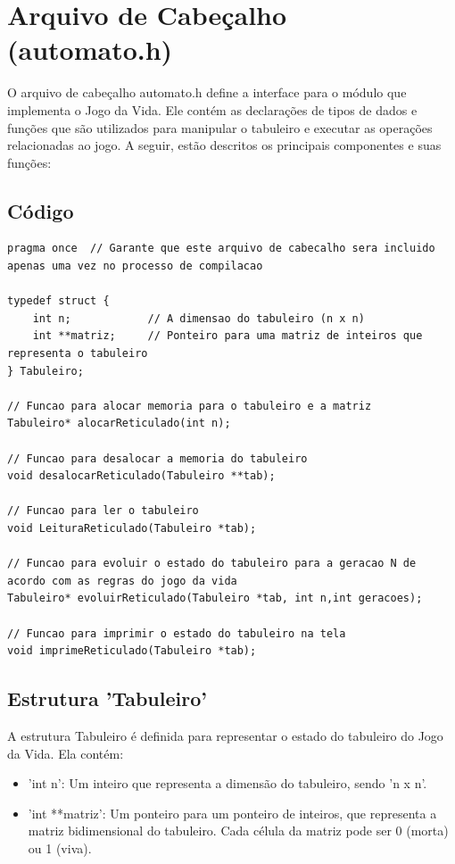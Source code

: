 \documentclass{article}
\begin{document}
\section{Arquivo de Cabeçalho (automato.h)}

O arquivo de cabeçalho automato.h define a interface para o módulo que implementa o Jogo da Vida. Ele contém as declarações de tipos de dados e funções que são utilizados para manipular o tabuleiro e executar as operações relacionadas ao jogo. A seguir, estão descritos os principais componentes e suas funções:

\subsection{Código}


\begin{lstlisting}[caption={},label={lst:cod1},language={[x86masm]Assembler}]
pragma once  // Garante que este arquivo de cabecalho sera incluido apenas uma vez no processo de compilacao

typedef struct {
    int n;            // A dimensao do tabuleiro (n x n)
    int **matriz;     // Ponteiro para uma matriz de inteiros que representa o tabuleiro
} Tabuleiro;

// Funcao para alocar memoria para o tabuleiro e a matriz
Tabuleiro* alocarReticulado(int n);

// Funcao para desalocar a memoria do tabuleiro
void desalocarReticulado(Tabuleiro **tab);

// Funcao para ler o tabuleiro
void LeituraReticulado(Tabuleiro *tab);

// Funcao para evoluir o estado do tabuleiro para a geracao N de acordo com as regras do jogo da vida
Tabuleiro* evoluirReticulado(Tabuleiro *tab, int n,int geracoes);

// Funcao para imprimir o estado do tabuleiro na tela
void imprimeReticulado(Tabuleiro *tab);
 \end{lstlisting}

 \subsection{Estrutura 'Tabuleiro'}

A estrutura Tabuleiro é definida para representar o estado do tabuleiro do Jogo da Vida. Ela contém:

\begin{itemize}
    \item 'int n': Um inteiro que representa a dimensão do tabuleiro, sendo 'n x n'.
    \item 'int **matriz': Um ponteiro para um ponteiro de inteiros, que representa a matriz bidimensional do tabuleiro. Cada célula da matriz pode ser 0 (morta) ou 1 (viva).
\end{itemize}
\end{document}
